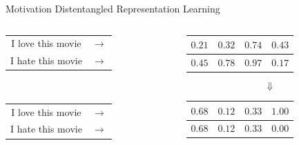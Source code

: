 \documentclass{beamer}
\begin{document}
\begin{frame}{Motivation}
	\centering
	{\Large Distentangled Representation Learning} \\
	\vspace{1cm}
	\begin{columns}[T] %
		\begin{column}{.3\textwidth}
			\centering
			\begin{tabular}{ c c }
				I love this movie & $\rightarrow$ \\
				I hate this movie & $\rightarrow$ \\
			\end{tabular}\\
			\vspace{1.8cm}
			\begin{tabular}{ c c }
				I love this movie & $\rightarrow$ \\
				I hate this movie & $\rightarrow$ \\
			\end{tabular}
		\end{column}
		\hfill
		\begin{column}{.6\textwidth}
			\centering
			\begin{tabular}{ | c | c | c | c | }
				\hline
				$0.21$ & $0.32$ & $0.74$ & $0.43$ \\
				\hline
				\hline
				$0.45$ & $0.78$ & $0.97$ & $0.17$ \\
				\hline
			\end{tabular}
			{\Huge$$\Downarrow$$}
			\begin{tabular}{ | c | c | c | c | }
				\hline
				$0.68$ & $0.12$ & $0.33$ & {\color{red}$1.00$} \\
				\hline
				\hline
				$0.68$ & $0.12$ & $0.33$ & {\color{red}$0.00$} \\
				\hline
			\end{tabular}
		\end{column}
	\end{columns}
\end{frame}
\end{document}
